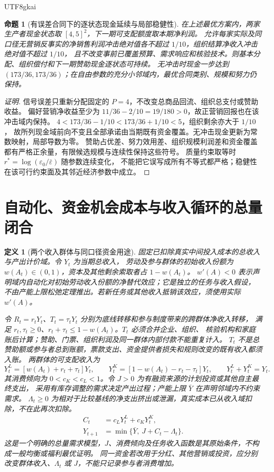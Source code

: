 \documentclass[12pt,a4paper,openany]{report}
\newtheorem{definition}{定义}[chapter]
\newtheorem{proposition}{命题}[chapter]
\begin{document}
\begin{CJK*}{UTF8}{gkai}
\begin{proposition}[有误差合同下的逐状态现金延续与局部稳健性]
\label{prop:noisy-cycle-robustness}
在上述最优方案内，两家生产者现金状态取 \([4,5]^2\)，下一期可支配额度取本期净利润。
允许每家实际及同口径无营销反事实的净销售利润冲击绝对值各不超过 \(1/10\)，组织结算净收入冲击绝对值不超过 \(1/10\)，
且不改变事前已覆盖预算、需求响应和核验技术。则基本分配、组织偿付和下一期赞助现金逐状态可持续。
无冲击时现金一步达到 \((173/36,173/36)\)；在自由参数的充分小邻域内，最优合同类别、规模和努力仍保持。
\end{proposition}
\begin{proof}[证明]
信号误差只重新分配固定的 \(P=4\)，不改变总商品回流、组织总支付或赞助收益。
偏好营销净收益至少为 \(11/36-2/10=19/180>0\)，故正营销回报也在该冲击域内保持。
\(4<173/36-1/10<173/36+1/10<5\)，组织剩余亦大于 \(1/10\)，
故所列现金域前向不变且全部承诺由当期既有资金覆盖。无冲击现金更新为常数映射，局部导数为零。
赞助占优差、努力效用差、组织规模利润差和资金覆盖都有严格正余量，有限候选规模与连续性保持这些符号。
质量约束取等时 \(r^*=\log(\varepsilon_0/\bar\varepsilon)\) 随参数连续变化，
不能把它误写成所有不等式都严格；稳健性在该可行约束面及其邻近经济参数中成立。
\end{proof}

\section{自动化、资金机会成本与收入循环的总量闭合}
\label{sec:aggregate-income-closure}

\begin{definition}[两个收入群体与同口径资金用途]
\label{def:aggregate-income-transfer}
固定已扣除真实中间投入成本的总收入与产出计价域。令 \(Y_t\) 为当期总收入，
劳动及参与群体的初始收入份额为 \(w(A_t)\in(0,1)\)，资本及其他剩余索取者占 \(1-w(A_t)\)。
\(w'(A)<0\) 表示声明域内自动化对初始劳动收入份额的净替代效应；它是独立的任务与收入假设，
不由产能上限松弛定理推出。若新任务或其他收入抵销该效应，须使用实际 \(w'(A)\)。

令 \(R_t=r_tY_t\)、\(T_t=\tau_tY_t\) 分别为底线转移和参与制度带来的跨群体净收入转移，
满足 \(r_t,\tau_t\ge0\)、\(r_t+\tau_t\le1-w(A_t)\)。\(T_t\) 必须合并企业、组织、
核验机构和家庭账后计算；赞助、门票、组织利润及同一群体内部付款不能重复计入。
\(T_t\) 不是总赞助额或参与者总到账额，票款支出、资金提供者损失和规则改变的既有收入都须入账。
两群体的可支配收入为
\[
 Y_t^L=[w(A_t)+r_t+\tau_t]Y_t,\qquad
 Y_t^K=[1-w(A_t)-r_t-\tau_t]Y_t,
 \qquad Y_t^L+Y_t^K=Y_t.
\]
其消费倾向为 \(0<c_K<c_L<1\)。令 \(J>0\) 为有融资来源的计划投资或其他自主最终支出，
采用有库存调整的需求决定产出过程；产能上限 \(\bar Y\) 在声明邻域内不约束需求。
\(\Lambda_t\ge0\) 为相对于比较基线的净支出挤出或泄漏，真实成本已从收入域扣除，不在此再次扣除。
\[
 \begin{aligned}
 C_t&=c_LY_t^L+c_KY_t^K,\\
 Y_{t+1}&=\min\{\bar Y,\ J+C_t-\Lambda_t\}.
 \end{aligned}
\]
这是一个明确的总量需求模型，\(J\)、消费倾向及任务收入函数是其原始条件，不构成一般均衡或福利最优证明。
同一资金若改用于分红、其他营销或投资，应分别改变群体收入、\(\Lambda_t\) 或 \(J\)，不能只记录参与者消费增加。
\end{definition}


\end{CJK*}
\end{document}
